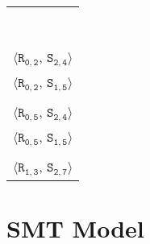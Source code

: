 \newsavebox{\boxMP}
\begin{lrbox}{\boxMP}
\normalsize
\begin{tabular}[t]{l}
\\\\\\\\\\\\\\\\\\
$\langle\mathtt{R_{0,2}}$, $\mathtt{S_{2,4}}\rangle$\\
$\langle\mathtt{R_{0,2}}$, $\mathtt{S_{1,5}}\rangle$\\
\\
$\langle\mathtt{R_{0,5}}$, $\mathtt{S_{2,4}}\rangle$\\
$\langle\mathtt{R_{0,5}}$, $\mathtt{S_{1,5}}\rangle$\\
\\
$\langle\mathtt{R_{1,3}}$, $\mathtt{S_{2,7}}\rangle$\\
\end{tabular}
\end{lrbox}


\section{SMT Model}\label{sec:smt}


